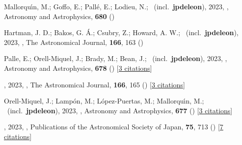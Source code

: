 \item[{\color{numcolor}\scriptsize69}] Mallorqu{\'\i}n, M.; Goffo, E.; Pall{\'e}, E.; Lodieu, N.; \etal\ (incl.\ \textbf{jpdeleon}), 2023, , Astronomy and Astrophysics, \textbf{680} ()

\item[{\color{numcolor}\scriptsize68}] Hartman, J. D.; Bakos, G. {\'A}.; Csubry, Z.; Howard, A. W.; \etal\ (incl.\ \textbf{jpdeleon}), 2023, , The Astronomical Journal, \textbf{166}, 163 ()

\item[{\color{numcolor}\scriptsize67}] Palle, E.; Orell-Miquel, J.; Brady, M.; Bean, J.; \etal\ (incl.\ \textbf{jpdeleon}), 2023, , Astronomy and Astrophysics, \textbf{678} () [\href{https://ui.adsabs.harvard.edu/abs/2023A&A...678A..80P}{3 citations}]

\item[{\color{numcolor}\scriptsize66}] , 2023, , The Astronomical Journal, \textbf{166}, 165 () [\href{https://ui.adsabs.harvard.edu/abs/2023AJ....166..165G}{3 citations}]

\item[{\color{numcolor}\scriptsize65}] Orell-Miquel, J.; Lamp{\'o}n, M.; L{\'o}pez-Puertas, M.; Mallorqu{\'\i}n, M.; \etal\ (incl.\ \textbf{jpdeleon}), 2023, , Astronomy and Astrophysics, \textbf{677} () [\href{https://ui.adsabs.harvard.edu/abs/2023A&A...677A..56O}{3 citations}]

\item[{\color{numcolor}\scriptsize64}] , 2023, , Publications of the Astronomical Society of Japan, \textbf{75}, 713 () [\href{https://ui.adsabs.harvard.edu/abs/2023PASJ...75..713K}{7 citations}]

